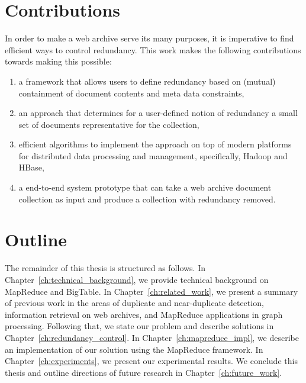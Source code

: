 \section{Contributions}
In order to make a web archive serve its many purposes, it is imperative to
find efficient ways to control redundancy. This work makes the following
contributions towards making this possible:

\begin{enumerate}

  \item a framework that allows users to define redundancy based on (mutual)
    containment of document contents and meta data constraints,
  \item an approach that determines for a user-defined notion of redundancy a
    small set of documents representative for the collection,
  \item efficient algorithms to implement the approach on top of modern
    platforms for distributed data processing and management, specifically,
    Hadoop and HBase,
  \item a end-to-end system prototype that can take a web archive document
    collection as input and produce a collection with redundancy removed.

    \begin{comment}
\item use existing measures and methods to define if a document is ``redundant"
  or ``covered."
\item propose an efficient method to find the set of all redundant documents
  and the set of all representative documents in a collection.
\item use existing frameworks to run the method proposed above in a distributed
  computing environment.
\item propose an end-to-end system prototype that can take a web archive
  document collection and produce a collection with redundancies removed.

  \end{comment}
\end{enumerate}

\section{Outline}

The remainder of this thesis is structured as follows. In
Chapter~\ref{ch:technical_background}, we provide technical background on
MapReduce and BigTable. In Chapter~\ref{ch:related_work}, we present a
summary of previous work in the areas of duplicate and near-duplicate detection,
information retrieval on web archives, and MapReduce applications in graph
processing. Following that, we state our problem and describe solutions in
Chapter~\ref{ch:redundancy_control}. In Chapter~\ref{ch:mapreduce_impl}, we
describe an implementation of our solution using the MapReduce framework. In
Chapter~\ref{ch:experiments}, we present our experimental results. We conclude
this thesis and outline directions of future research in Chapter~\ref{ch:future_work}.

